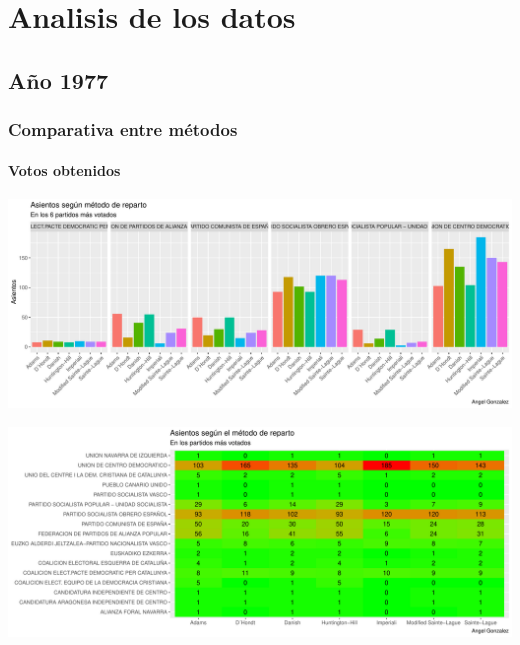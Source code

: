 \documentclass[12pt,a4paper,]{book}
\numberwithin{dummy}{section}
\theoremstyle{ocrenumbox}
\theoremstyle{blacknumex}
\theoremstyle{blacknumbox}
\theoremstyle{ocrenum}
\theoremstyle{ocrenum}
\begin{document}
\hypertarget{analisis-de-los-datos}{%
\chapter{Analisis de los datos}\label{analisis-de-los-datos}}

\hypertarget{auxf1o-1977}{%
\section{Año 1977}\label{auxf1o-1977}}

\hypertarget{comparativa-entre-muxe9todos}{%
\subsection{Comparativa entre
métodos}\label{comparativa-entre-muxe9todos}}

\hypertarget{votos-obtenidos}{%
\subsubsection{Votos obtenidos}\label{votos-obtenidos}}

\begin{center}\includegraphics[width=0.95\linewidth]{figurasR/unnamed-chunk-59-1} \end{center}

\begin{center}\includegraphics[width=0.95\linewidth]{figurasR/unnamed-chunk-59-2} \end{center}
\end{document}
